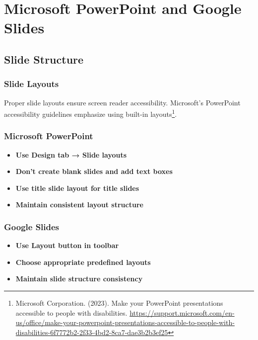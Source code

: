 \section{Microsoft PowerPoint and Google Slides}
\label{sec:ppt-google-slides}

\subsection{Slide Structure}

\subsubsection{Slide Layouts}
Proper slide layouts ensure screen reader accessibility. Microsoft's PowerPoint accessibility guidelines emphasize using built-in layouts\footnote{Microsoft Corporation. (2023). Make your PowerPoint presentations accessible to people with disabilities. \url{https://support.microsoft.com/en-us/office/make-your-powerpoint-presentations-accessible-to-people-with-disabilities-6f7772b2-2f33-4bd2-8ca7-dae3b2b3ef25}}.

\subsubsection{Microsoft PowerPoint}
\vspace{1em}
\begin{itemize}
\item \textbf{Use Design tab → Slide layouts}
\item \textbf{Don't create blank slides and add text boxes}
\item \textbf{Use title slide layout for title slides}
\item \textbf{Maintain consistent layout structure}
\end{itemize}
\vspace{1em}

\subsubsection{Google Slides}
\vspace{1em}
\begin{itemize}
\item \textbf{Use Layout button in toolbar}
\item \textbf{Choose appropriate predefined layouts}
\item \textbf{Maintain slide structure consistency}
\end{itemize}
\vspace{1em}

